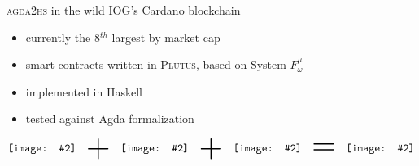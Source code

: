 \documentclass[aspectratio=169]{beamer}
\newcommand\agdatohs{\textsc{agda2hs}\xspace}
\newcommand\plutus{\textsc{Plutus}\xspace}
\newcommand\systemF{System \ensuremath{F^{\mu}_{\omega}}\xspace}
\newcommand\img[2]{\texttt{[image: \#2]}}
\newcommand*\vmid[1]{\vcenter{\hbox{#1}}}
\begin{document}
\begin{frame}[fragile]{\agdatohs in the wild}
IOG's Cardano blockchain
\begin{itemize}
\item currently the 8$^{th}$ largest by market cap
\item smart contracts written in \plutus, based on \systemF
\item implemented in Haskell
\item tested against Agda formalization
\end{itemize}
\pause
\vfill
\[
\vmid{\img{1.5cm}{plutus}}
\vmid{\scalebox{2}{\Large$\ +\ $}}
\vmid{\img{1.5cm}{agda}}
\vmid{\scalebox{2}{\Large$\ +\ $}}
\vmid{\img{1.5cm}{haskell}}
\vmid{\scalebox{2}{\Large$\ =\ $}}
\vmid{\img{1.5cm}{heart}}
\]
\end{frame}
\end{document}
